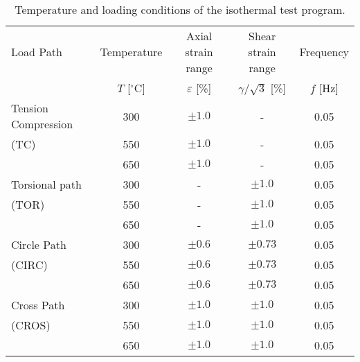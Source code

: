 \documentclass[preprint,5p,twocolumn,11pt,sort&compress]{elsarticle}
\begin{document}
\begin{table*}[htbp]
  \centering
  \caption{Temperature and loading conditions of the isothermal test program.}
    \begin{tabular}{lcccc}
    \hline
    Load Path & Temperature & Axial strain range  & Shear strain range & Frequency\\
              & $T$ [$^{\circ}$C] & $\varepsilon$ [\%]& $\gamma /\sqrt 3$ [\%] & $f$ [Hz]  \\
    \hline
    Tension Compression   & 300 & $\pm1.0$ & - & 0.05 \\
    (TC)         & 550 & $\pm1.0$ & - & 0.05 \\
                 & 650 & $\pm1.0$ & - & 0.05 \\
    \hline
    Torsional path & 300 & - & $\pm1.0$ & 0.05 \\
    (TOR)       & 550 & - & $\pm1.0$ & 0.05 \\
                & 650 & - & $\pm1.0$ & 0.05 \\
    \hline
    Circle Path & 300 & $\pm0.6$ & $\pm0.73$ & 0.05 \\
    (CIRC)      & 550 & $\pm0.6$ & $\pm0.73$ & 0.05 \\
                & 650 & $\pm0.6$ & $\pm0.73$ & 0.05 \\
    \hline
    Cross Path   & 300 & $\pm1.0$ & $\pm1.0$ & 0.05 \\
    (CROS)       & 550 & $\pm1.0$ & $\pm1.0$ & 0.05 \\
                 & 650 & $\pm1.0$ & $\pm1.0$ & 0.05 \\
    \hline
    \end{tabular}%
  \label{tab:Loading-Conditions-IF}%
\end{table*}%
\end{document}
